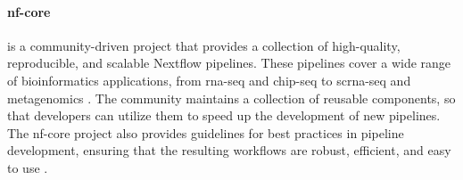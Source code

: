 \paragraph{nf-core} is a community-driven project that provides a collection of
high-quality, reproducible, and scalable Nextflow pipelines.
These pipelines cover a wide range of bioinformatics applications, from
\gls{rna-seq} and \gls{chip-seq} to \gls{scrna-seq} and metagenomics
\supercite{ewels_nf-core_2020}.
The community maintains a collection of reusable components, so that developers
can utilize them to speed up the development of new pipelines.
The nf-core project also provides guidelines for best practices in pipeline
development, ensuring that the resulting workflows are robust, efficient, and
easy to use \supercite{ewels_nf-core_2020}.
